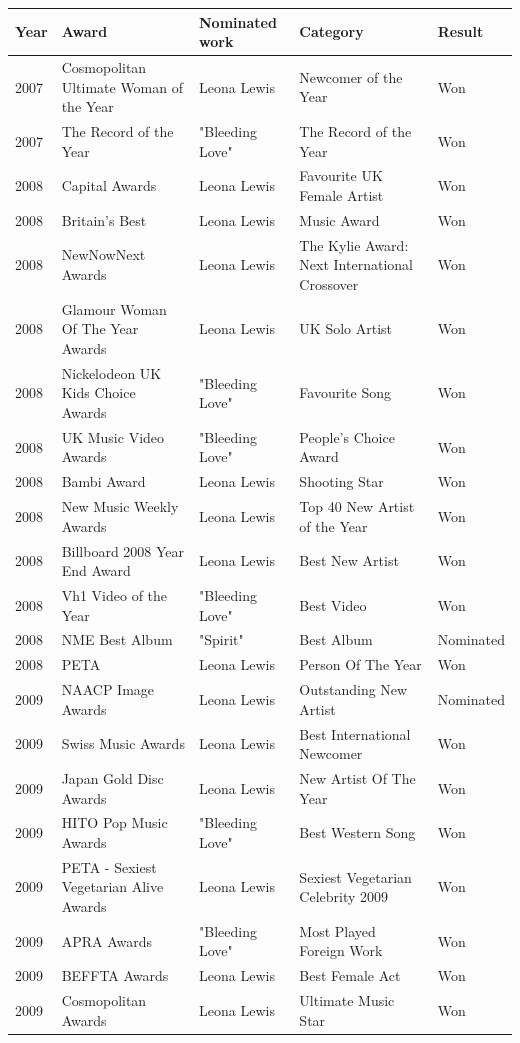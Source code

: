 \documentclass{article}
\begin{document}
\begin{tabular}{lllll}
\toprule
Year & Award & Nominated work & Category & Result \\
\midrule
2007 & Cosmopolitan Ultimate Woman of the Year & Leona Lewis & Newcomer of the Year & Won \\
2007 & The Record of the Year & "Bleeding Love" & The Record of the Year & Won \\
2008 & Capital Awards & Leona Lewis & Favourite UK Female Artist & Won \\
2008 & Britain's Best & Leona Lewis & Music Award & Won \\
2008 & NewNowNext Awards & Leona Lewis & The Kylie Award: Next International Crossover & Won \\
2008 & Glamour Woman Of The Year Awards & Leona Lewis & UK Solo Artist & Won \\
2008 & Nickelodeon UK Kids Choice Awards & "Bleeding Love" & Favourite Song & Won \\
2008 & UK Music Video Awards & "Bleeding Love" & People's Choice Award & Won \\
2008 & Bambi Award & Leona Lewis & Shooting Star & Won \\
2008 & New Music Weekly Awards & Leona Lewis & Top 40 New Artist of the Year & Won \\
2008 & Billboard 2008 Year End Award & Leona Lewis & Best New Artist & Won \\
2008 & Vh1 Video of the Year & "Bleeding Love" & Best Video & Won \\
2008 & NME Best Album & "Spirit" & Best Album & Nominated \\
2008 & PETA & Leona Lewis & Person Of The Year & Won \\
2009 & NAACP Image Awards & Leona Lewis & Outstanding New Artist & Nominated \\
2009 & Swiss Music Awards & Leona Lewis & Best International Newcomer & Won \\
2009 & Japan Gold Disc Awards & Leona Lewis & New Artist Of The Year & Won \\
2009 & HITO Pop Music Awards & "Bleeding Love" & Best Western Song & Won \\
2009 & PETA - Sexiest Vegetarian Alive Awards & Leona Lewis & Sexiest Vegetarian Celebrity 2009 & Won \\
2009 & APRA Awards & "Bleeding Love" & Most Played Foreign Work & Won \\
2009 & BEFFTA Awards & Leona Lewis & Best Female Act & Won \\
2009 & Cosmopolitan Awards & Leona Lewis & Ultimate Music Star & Won \\
\bottomrule
\end{tabular}
\end{document}
